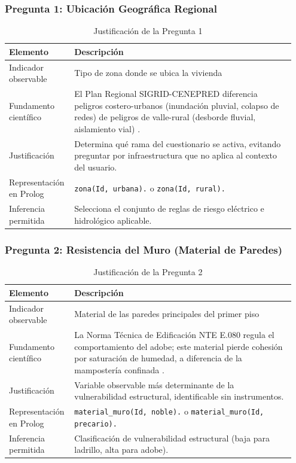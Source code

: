 \documentclass[12pt, letterpaper]{article}
\begin{document}
\subsubsection*{Pregunta 1: Ubicación Geográfica Regional}
\begin{table}[H]
\centering
\caption{Justificación de la Pregunta 1}
\label{tab:p1}
\begin{tabular}{@{}p{0.2\linewidth}p{0.75\linewidth}@{}}
\toprule
\textbf{Elemento} & \textbf{Descripción} \\ \midrule
Indicador observable & Tipo de zona donde se ubica la vivienda \\
Fundamento científico & El Plan Regional SIGRID-CENEPRED diferencia peligros costero-urbanos (inundación pluvial, colapso de redes) de peligros de valle-rural (desborde fluvial, aislamiento vial) \parencite{gob_regional_lambayeque_2023}. \\
Justificación & Determina qué rama del cuestionario se activa, evitando preguntar por infraestructura que no aplica al contexto del usuario. \\
Representación en Prolog & \texttt{zona(Id, urbana).} o \texttt{zona(Id, rural).} \\
Inferencia permitida & Selecciona el conjunto de reglas de riesgo eléctrico e hidrológico aplicable. \\ \bottomrule
\end{tabular}
\end{table}

\subsubsection*{Pregunta 2: Resistencia del Muro (Material de Paredes)}
\begin{table}[H]
\centering
\caption{Justificación de la Pregunta 2}
\label{tab:p2}
\begin{tabular}{@{}p{0.2\linewidth}p{0.75\linewidth}@{}}
\toprule
\textbf{Elemento} & \textbf{Descripción} \\ \midrule
Indicador observable & Material de las paredes principales del primer piso \\
Fundamento científico & La Norma Técnica de Edificación NTE E.080 regula el comportamiento del adobe; este material pierde cohesión por saturación de humedad, a diferencia de la mampostería confinada \parencite{min_vivienda_rne}. \\
Justificación & Variable observable más determinante de la vulnerabilidad estructural, identificable sin instrumentos. \\
Representación en Prolog & \texttt{material\_muro(Id, noble).} o \texttt{material\_muro(Id, precario).} \\
Inferencia permitida & Clasificación de vulnerabilidad estructural (baja para ladrillo, alta para adobe). \\ \bottomrule
\end{tabular}
\end{table}
\end{document}
